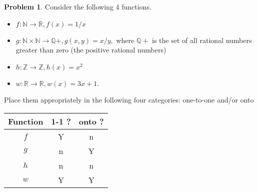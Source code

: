 \documentclass[10pt,leqno ]{article}
\theoremstyle{definition}
\newtheorem{problem}[theorem]{Problem}
\begin{document}
\begin{problem} Consider the following 4 functions.
\begin{itemize}
\item $f:\mathbb{N} \to \mathbb{R} ,f(x) = 1/x$\\
\item $g:\mathbb{N} \times \mathbb{N} \to \mathbb{Q}+,g(x, y) =x/y,$ where $\mathbb{Q}+$ is the set of all rational numbers greater than zero (the positive rational numbers)\\
\item $h:\mathbb{Z} \to \mathbb{Z} ,h(x) = x^2$\\
\item $w:\mathbb{R} \to \mathbb{R}, w(x) = 3x+ 1$.
\end{itemize}
Place them appropriately in the following four categories:  one-to-one and/or onto
\\
\Large

\begin{table}[H]
\begin{tabular}{|c|c|c|}
\hline
Function & 1-1 ? & onto ? \\ \hline
$f$ & Y & n \\ \hline
$g$ & n & Y \\ \hline
$h$ & n &  n\\ \hline
$w$ & Y &  Y\\ \hline
\end{tabular}
\end{table}

\end{problem}
\end{document}

